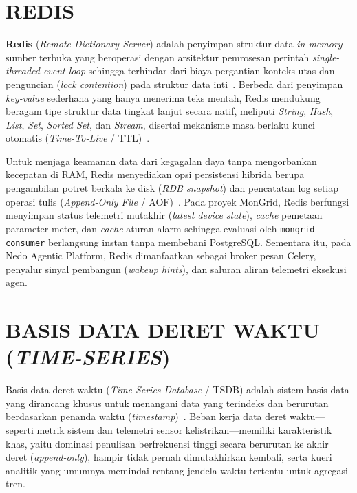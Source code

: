 \section{REDIS}

\textbf{Redis} (\textit{Remote Dictionary Server}) adalah penyimpan struktur data \textit{in-memory} sumber terbuka yang beroperasi dengan arsitektur pemrosesan perintah \textit{single-threaded event loop} sehingga terhindar dari biaya pergantian konteks utas dan penguncian (\textit{lock contention}) pada struktur data inti~\cite{redis_doc, kabakus2017performance}. Berbeda dari penyimpan \textit{key-value} sederhana yang hanya menerima teks mentah, Redis mendukung beragam tipe struktur data tingkat lanjut secara natif, meliputi \textit{String}, \textit{Hash}, \textit{List}, \textit{Set}, \textit{Sorted Set}, dan \textit{Stream}, disertai mekanisme masa berlaku kunci otomatis (\textit{Time-To-Live} / TTL)~\cite{redis_doc}.

Untuk menjaga keamanan data dari kegagalan daya tanpa mengorbankan kecepatan di RAM, Redis menyediakan opsi persistensi hibrida berupa pengambilan potret berkala ke disk (\textit{RDB snapshot}) dan pencatatan log setiap operasi tulis (\textit{Append-Only File} / AOF)~\cite{redis_doc}. Pada proyek MonGrid, Redis berfungsi menyimpan status telemetri mutakhir (\textit{latest device state}), \textit{cache} pemetaan parameter meter, dan \textit{cache} aturan alarm sehingga evaluasi oleh \texttt{mongrid-consumer} berlangsung instan tanpa membebani PostgreSQL. Sementara itu, pada Nedo Agentic Platform, Redis dimanfaatkan sebagai broker pesan Celery, penyalur sinyal pembangun (\textit{wakeup hints}), dan saluran aliran telemetri eksekusi agen.

\section{BASIS DATA DERET WAKTU (\textit{TIME-SERIES})}

Basis data deret waktu (\textit{Time-Series Database} / TSDB) adalah sistem basis data yang dirancang khusus untuk menangani data yang terindeks dan berurutan berdasarkan penanda waktu (\textit{timestamp})~\cite{pelkonen2015gorilla}. Beban kerja data deret waktu—seperti metrik sistem dan telemetri sensor kelistrikan—memiliki karakteristik khas, yaitu dominasi penulisan berfrekuensi tinggi secara berurutan ke akhir deret (\textit{append-only}), hampir tidak pernah dimutakhirkan kembali, serta kueri analitik yang umumnya memindai rentang jendela waktu tertentu untuk agregasi tren.

